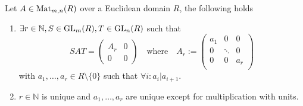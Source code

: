 \begin{theorem}\label{thm:smith-normalform}
   Let \(A \in \operatorname{Mat}_{m, n}(R)\) over a Euclidean domain \(R\), the following holds
   \begin{enumerate}[label=\roman*, align=Center]
      \item \(\exists r \in \mathbb{N}, S \in \operatorname{GL}_m(R), T \in \operatorname{GL}_n(R)\) such that
         \[SAT = \left(\begin{array}{c|c} A_r & 0\\ \hline 0 & 0 \end{array}\right) \quad\text{where}\quad
            A_r := \begin{pmatrix}
               a_1 & 0      & 0 \\
               0   & \ddots & 0 \\
               0   & 0      & a_r \\
         \end{pmatrix}\]
         with \(a_1, \ldots, a_r \in R \setminus \{0\}\) such that \(\forall i: a_i | a_{i+1}\).
      \item \(r \in \mathbb{N}\) is unique and \(a_1, \ldots, a_r\) are unique except for multiplication with units.
   \end{enumerate}
\end{theorem}

